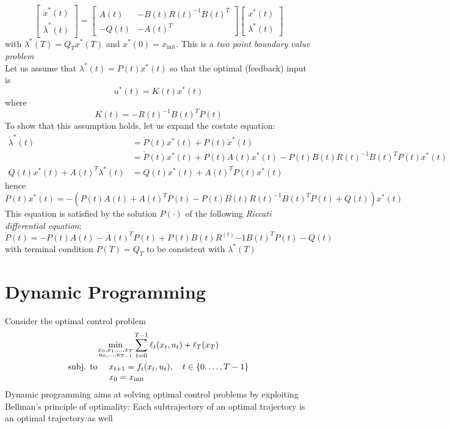 \documentclass[openany]{book}
\theoremstyle{definition}
\theoremstyle{remark}
\begin{document}
\[
    \begin{bmatrix}
        \dot{x}^*(t) \\ \dot{\lambda}^*(t)
    \end{bmatrix} = \begin{bmatrix}
        A(t) & -B(t)R(t)^{-1}B(t)^T \\ -Q(t) & -A(t)^T
    \end{bmatrix} \begin{bmatrix}
        x^*(t) \\ \lambda^*(t)
    \end{bmatrix}
\]
with $\lambda^*(T)=Q_Tx^*(T)$ and $x^*(0)=x_{\text{init}}$. This is a \emph{two point boundary value problem}\\
Let us assume that $\lambda^*(t)=P(t)x^*(t)$ so that the optimal (feedback) input is 
\[
    u^*(t) = K(t)x^*(t)
\]
where 
\[
    K(t) = -R(t)^{-1}B(t)^TP(t)
\]
To show that this assumption holds, let us expand the costate equation: 
\begin{align*}
    \dot{\lambda}^*(t) &= \dot{P}(t)x^*(t)+P(t)\dot{x}^*(t)\\
     &= \dot{P}(t)x^*(t)+P(t)A(t)x^*(t)-P(t)B(t)R(t)^{-1}B(t)^TP(t)x^*(t)\\
    Q(t)x^*(t)+A(t)^T\lambda^*(t) &= Q(t)x^*(t)+A(t)^TP(t)x^*(t)
\end{align*}
hence 
\[
    \dot{P}(t)x^*(t) = -\left(P(t)A(t)+A(t)^TP(t)-P(t)B(t)R(t)^{-1}B(t)^TP(t)+Q(t)\right)x^*(t)
\]
This equation is satisfied by the solution $P(\cdot)$ of the following \emph{Riccati differential equation}:
\[
    \dot{P}(t) = -P(t)A(t)-A(t)^TP(t)+P(t)B(t)R^(t){-1}B(t)^TP(t)-Q(t)
\]
with terminal condition $P(T)=Q_T$ to be consistent with $\lambda^*(T)$












\chapter{Dynamic Programming}
Consider the optimal control problem 
\begin{gather*}
    \min_{\substack{x_0,x_1,\dots,x_T\\u_0,\dots,u_{T-1}}} \displaystyle\sum_{t=0}^{T-1}\ell_t(x_t,u_t)+\ell_T(x_T)\\
    \begin{array}{l l }
        \text{subj. to } & x_{t+1}=f_t(x_t,u_t), \quad t\in\{0,\dots,T-1\}\\
                         & x_0 = x_{\text{init}}
    \end{array}
\end{gather*}
Dynamic programming aims at solving optimal control problems by exploiting Bellman's principle of optimality: Each subtrajectory of an optimal trajectory is an optimal trajectory as well
\end{document}
